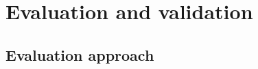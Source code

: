 \chapter{Evaluation and validation}
\label{ch:Evalutation-Validation}

\section{Evaluation approach}
\label{sec:Evaluation-Approach}

